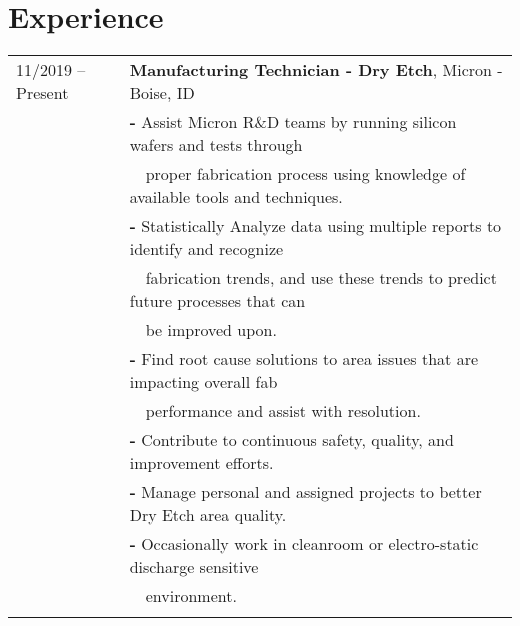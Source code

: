 \documentclass[a4paper,12pt]{article}
\begin{document}
\section{Experience}
\begin{tabular}{ll}
11/2019 -- Present  & \textbf{Manufacturing Technician - Dry Etch}, Micron - Boise, ID \\
         & \textbf{-} Assist Micron R\&D teams by running silicon wafers and tests through\\
         & \-\ \-\ proper fabrication process using knowledge of available tools and techniques.\\
         & \textbf{-} Statistically Analyze data using multiple reports to identify and recognize\\
         & \-\ \-\ fabrication trends, and use these trends to predict future processes that can\\
         & \-\ \-\ be improved upon.\\
         & \textbf{-} Find root cause solutions to area issues that are impacting overall fab\\
         & \-\ \-\ performance and assist with resolution.\\
         & \textbf{-} Contribute to continuous safety, quality, and improvement efforts.\\
         & \textbf{-} Manage personal and assigned projects to better Dry Etch area quality.\\
         & \textbf{-} Occasionally work in cleanroom or electro-static discharge sensitive\\
         & \-\ \-\ environment.\\
         \\
\end{tabular}
\end{document}
